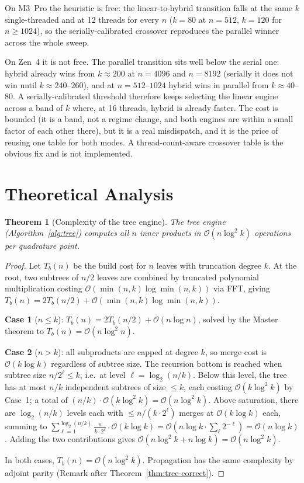 \documentclass[11pt]{article}
\newtheorem{theorem}{Theorem}[section]
\newcommand{\bigO}{\mathcal{O}}
\begin{document}
On M3~Pro the heuristic is free: the linear-to-hybrid transition falls at the
same $k$ single-threaded and at 12 threads for every $n$ ($k = 80$ at
$n = 512$, $k = 120$ for $n \ge 1024$), so the serially-calibrated crossover
reproduces the parallel winner across the whole sweep.

On Zen~4 it is not free. The parallel transition sits well below the serial
one: hybrid already wins from $k \approx 200$ at $n = 4096$ and $n = 8192$
(serially it does not win until $k \approx 240$--$260$), and at
$n = 512$--$1024$ hybrid wins in parallel from $k \approx 40$--$80$. A
serially-calibrated threshold therefore keeps selecting the linear engine
across a band of $k$ where, at 16 threads, hybrid is already faster. The
cost is bounded (it is a band, not a regime change, and both engines are
within a small factor of each other there), but it is a real
misdispatch, and it is the price of reusing one table for both modes. A
thread-count-aware crossover table is the obvious fix and is not implemented.

\section{Theoretical Analysis}\label{sec:theory}

\begin{theorem}[Complexity of the tree engine]
The tree engine (Algorithm~\ref{alg:tree}) computes all $n$ inner products
in $\bigO(n \log^2 k)$ operations per quadrature point.
\end{theorem}
\begin{proof}
Let $T_b(n)$ be the build cost for $n$ leaves with truncation degree $k$.
At the root, two subtrees of $n/2$ leaves are combined by truncated
polynomial multiplication costing $\bigO(\min(n, k) \log \min(n, k))$ via
FFT, giving $T_b(n) = 2T_b(n/2) + \bigO(\min(n, k) \log \min(n, k))$.

\textbf{Case 1} ($n \le k$): $T_b(n) = 2T_b(n/2) + \bigO(n \log n)$,
solved by the Master theorem to $T_b(n) = \bigO(n \log^2 n)$.

\textbf{Case 2} ($n > k$): all subproducts are capped at degree $k$, so
merge cost is $\bigO(k \log k)$ regardless of subtree size. The recursion
bottom is reached when subtree size $n/2^\ell \le k$, i.e.\ at level
$\ell = \log_2(n/k)$. Below this level, the tree has at most $n/k$
independent subtrees of size $\le k$, each costing $\bigO(k \log^2 k)$
by Case~1; a total of $(n/k) \cdot \bigO(k \log^2 k) = \bigO(n \log^2 k)$.
Above saturation, there are $\log_2(n/k)$ levels each with
$\le n/(k \cdot 2^{\ell})$ merges at $\bigO(k \log k)$ each, summing to
$\sum_{\ell=1}^{\log_2(n/k)} \frac{n}{k \cdot 2^\ell} \cdot \bigO(k \log k)
= \bigO(n \log k \cdot \sum_{\ell} 2^{-\ell}) = \bigO(n \log k)$.
Adding the two contributions gives $\bigO(n \log^2 k + n \log k) =
\bigO(n \log^2 k)$.

In both cases, $T_b(n) = \bigO(n \log^2 k)$. Propagation has the same
complexity by adjoint parity (Remark after Theorem~\ref{thm:tree-correct}).
\end{proof}
\end{document}
